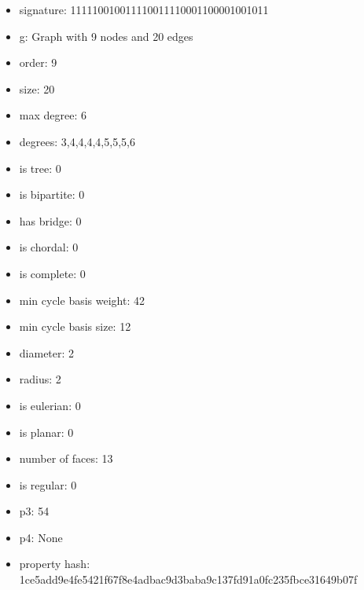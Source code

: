 \newpage
\begin{figure}
\end{figure}
\begin{itemize}
\item signature: 111110010011110011110001100001001011
\item g: Graph with 9 nodes and 20 edges
\item order: 9
\item size: 20
\item max degree: 6
\item degrees: 3,4,4,4,4,5,5,5,6
\item is tree: 0
\item is bipartite: 0
\item has bridge: 0
\item is chordal: 0
\item is complete: 0
\item min cycle basis weight: 42
\item min cycle basis size: 12
\item diameter: 2
\item radius: 2
\item is eulerian: 0
\item is planar: 0
\item number of faces: 13
\item is regular: 0
\item p3: 54
\item p4: None
\item property hash: 1ce5add9e4fe5421f67f8e4adbac9d3baba9c137fd91a0fc235fbce31649b07f
\end{itemize}
